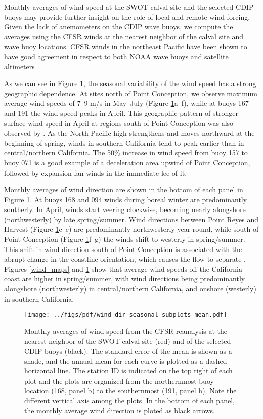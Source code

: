 Monthly averages of wind speed at the SWOT calval site and the selected CDIP buoys may provide further insight on the role of local and remote wind forcing. Given the lack of anemometers on the CDIP wave buoys, we compute the averages using the CFSR winds at the nearest neighbor of the calval site and wave buoy locations. CFSR winds in the northeast Pacific have been shown to have good agreement in respect to both NOAA wave buoys and satellite altimeters \citep[e.g.,][]{chawla2013validation, rascle2013global, stopa2014intercomparison}.

As we can see in Figure \ref{wind_series}, the seasonal variability of the wind speed has a strong geographic dependence. At sites north of Point Conception, we observe maximum average wind speeds of 7--9 m/s in May--July (Figure \ref{wind_series}a--f), while at buoys 167 and 191 the wind speed peaks in April. This geographic pattern of stronger surface wind speed in April at regions south of Point Conception was also observed by \cite{winant1988marine}. As the North Pacific high strengthens and moves northward at the beginning of spring, winds in southern California tend to peak earlier than in central/northern California. 
The 50\% increase in wind speed from buoy 157 to buoy 071 is a good example of a deceleration area upwind of Point Conception, followed by expansion fan winds in the immediate lee of it.

Monthly averages of wind direction are shown in the bottom of each panel in Figure \ref{wind_series}. At buoys 168 and 094 winds during boreal winter are predominantly southerly. In April, winds start veering clockwise, becoming nearly alongshore (northwesterly) by late spring/summer. Wind directions between Point Reyes and Harvest (Figure \ref{wind_series}c--e) are predominantly northwesterly year-round, while south of Point Conception (Figure \ref{wind_series}f--g) the winds shift to westerly in spring/summer. This shift in wind direction south of Point Conception is associated with the abrupt change in the coastline orientation, which causes the flow to separate \citep{harms1998characteristic}. Figures \ref{wind_maps} and \ref{wind_series} show that average wind speeds off the California coast are higher in spring/summer, with wind directions being predominantly alongshore (northwesterly) in central/northern California, and onshore (westerly) in southern California. 

\begin{figure}[h]
\centering
\texttt{[image: ../figs/pdf/wind\_dir\_seasonal\_subplots\_mean.pdf]}
\caption{Monthly averages of wind speed from the CFSR reanalysis at the nearest neighbor of the SWOT calval site (red) and of the selected CDIP buoys (black). The standard error of the mean is shown as a shade, and the annual mean for each curve is plotted as a dashed horizontal line. The station ID is indicated on the top right of each plot and the plots are organized from the northernmost buoy location (168, panel b) to the southernmost (191, panel h). Note the different vertical axis among the plots. In the bottom of each panel, the monthly average wind direction is ploted as black arrows. }
\label{wind_series}
\end{figure}

